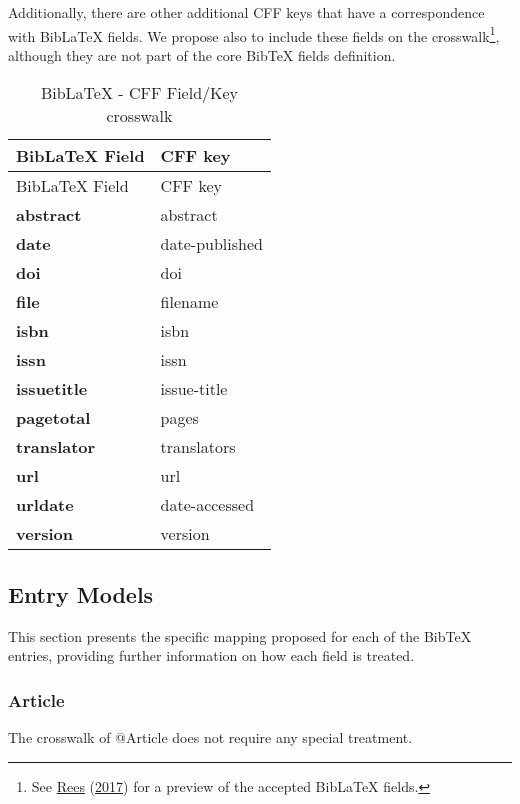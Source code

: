 \documentclass[
]{article}
\begin{document}
Additionally, there are other additional CFF keys that have a
correspondence with BibLaTeX fields. We propose also to include these
fields on the crosswalk\footnote{See
  \protect\hyperlink{ref-biblatexcheatsheet}{Rees}
  (\protect\hyperlink{ref-biblatexcheatsheet}{2017}) for a preview of
  the accepted BibLaTeX fields.}, although they are not part of the core
BibTeX fields definition.

\begin{longtable}[]{@{}ll@{}}
\caption{BibLaTeX - CFF Field/Key crosswalk}\tabularnewline
\toprule
BibLaTeX Field & CFF key \\
\midrule
\endfirsthead
\toprule
BibLaTeX Field & CFF key \\
\midrule
\endhead
\textbf{abstract} & abstract \\
\textbf{date} & date-published \\
\textbf{doi} & doi \\
\textbf{file} & filename \\
\textbf{isbn} & isbn \\
\textbf{issn} & issn \\
\textbf{issuetitle} & issue-title \\
\textbf{pagetotal} & pages \\
\textbf{translator} & translators \\
\textbf{url} & url \\
\textbf{urldate} & date-accessed \\
\textbf{version} & version \\
\bottomrule
\end{longtable}

\hypertarget{entry-models}{%
\subsection{Entry Models}\label{entry-models}}

This section presents the specific mapping proposed for each of the
BibTeX entries, providing further information on how each field is
treated.

\hypertarget{article}{%
\subsubsection{Article}\label{article}}

The crosswalk of @Article does not require any special treatment.
\end{document}
